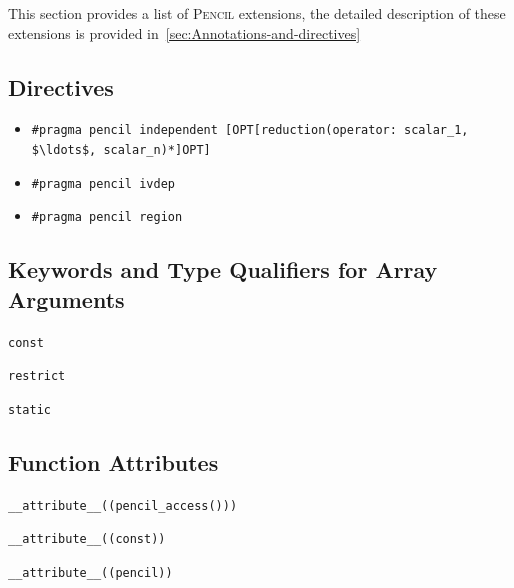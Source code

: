 \documentclass{carp}
\newcommand\pencil{\textsc{Pencil}\xspace}
\begin{document}
This section provides a list of \pencil extensions, the detailed
description of these extensions is provided
in~\ref{sec:Annotations-and-directives}

\subsection*{Directives}
\label{sec:for-directives}

\begin{itemize}
\item \lstinline!#pragma pencil independent [OPT[reduction(operator: scalar_1, $\ldots$, scalar_n)*]OPT]!
\item \lstinline!#pragma pencil ivdep!
\item \lstinline!#pragma pencil region!
\end{itemize}

\subsection*{Keywords and Type Qualifiers for Array Arguments}

\begin{description}
  \item \lstinline!const!
  \item \lstinline!restrict!
  \item \lstinline!static!
\end{description}

%

\subsection*{Function Attributes}

\begin{description}
  \item \lstinline!__attribute__((pencil_access()))!
  \item \lstinline!__attribute__((const))!
  \item \lstinline!__attribute__((pencil))!
\end{description}
\end{document}
